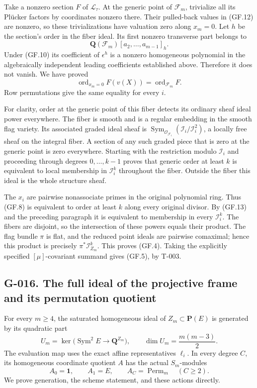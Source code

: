 \documentclass[
  10pt,
]{article}
\begin{document}
Take a nonzero section \(F\) of \(\mathcal L_\tau\). At the generic
point of \(\mathcal F_m\), trivialize all its Plücker factors by
coordinates nonzero there. Their pulled-back values in (GF.12) are
nonzero, so these trivializations have valuation zero along \(x_m=0\).
Let \(h\) be the section's order in the fiber ideal. Its first nonzero
transverse part belongs to \[
\mathbf Q(\mathcal F_m)[a_2,\ldots,a_{m-1}]_h.
\] Under (GF.10) its coefficient of \(\epsilon^h\) is a nonzero
homogeneous polynomial in the algebraically independent leading
coefficients established above. Therefore it does not vanish. We have
proved \[
\operatorname{ord}_{x_m=0}F(v(X))
=\operatorname{ord}_{\mathcal F_m}F.
\tag{GF.13}
\] Row permutations give the same equality for every \(i\).

For clarity, order at the generic point of this fiber detects its
ordinary sheaf ideal power everywhere. The fiber is smooth and is a
regular embedding in the smooth flag variety. Its associated graded
ideal sheaf is
\(\operatorname{Sym}_{\mathcal O_{\mathcal F_i}}(\mathcal I_i/\mathcal I_i^2)\),
a locally free sheaf on the integral fiber. A section of any such graded
piece that is zero at the generic point is zero everywhere. Starting
with the restriction modulo \(\mathcal I_i\) and proceeding through
degrees \(0,\ldots,k-1\) proves that generic order at least \(k\) is
equivalent to local membership in \(\mathcal I_i^k\) throughout the
fiber. Outside the fiber this ideal is the whole structure sheaf.

The \(x_i\) are pairwise nonassociate primes in the original polynomial
ring. Thus (GF.8) is equivalent to order at least \(k\) along every
original divisor. By (GF.13) and the preceding paragraph it is
equivalent to membership in every \(\mathcal I_i^k\). The fibers are
disjoint, so the intersection of these powers equals their product. The
flag bundle \(\pi\) is flat, and the reduced point ideals are pairwise
comaximal; hence this product is precisely \(\pi^*\mathcal I_{Z_m}^k\).
This proves (GF.4). Taking the explicitly specified \([\mu]\)-covariant
summand gives (GF.5), by T-003.

\subsection{G-016. The full ideal of the projective frame and its
permutation
quotient}\label{g-016.-the-full-ideal-of-the-projective-frame-and-its-permutation-quotient}

For every \(m\ge4\), the saturated homogeneous ideal of
\(Z_m\subset\mathbf P(E)\) is generated by its quadratic part \[
U_m=\ker\bigl(\operatorname{Sym}^2 E\longrightarrow\mathbf Q^{Z_m}\bigr),
\qquad\dim U_m=\frac{m(m-3)}2.
\tag{GF.14}
\] The evaluation map uses the exact affine representatives \(\ell_i\).
In every degree \(C\), its homogeneous coordinate quotient \(A\) has the
actual \(S_m\)-modules \[
\boxed{A_0=\mathbf1,\qquad A_1=E,\qquad
A_C=\operatorname{Perm}_m\quad(C\ge2).}
\tag{GF.15}
\] We prove generation, the scheme statement, and these actions
directly.
\end{document}
